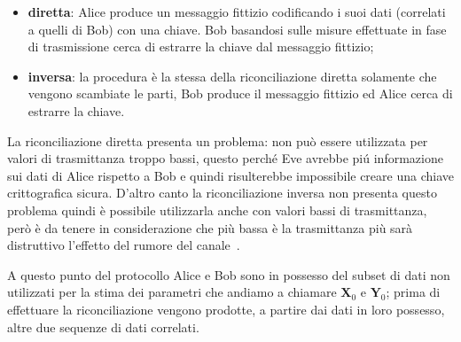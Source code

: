 \begin{itemize}
\item \textbf{diretta}: Alice produce un messaggio fittizio codificando i suoi dati (correlati a quelli di Bob) con una chiave. Bob basandosi sulle misure effettuate in fase di trasmissione cerca di estrarre la chiave dal messaggio fittizio;
\item \textbf{inversa}: la procedura \`e la stessa della riconciliazione diretta solamente che vengono scambiate le parti, Bob produce il messaggio fittizio ed Alice cerca di estrarre la chiave.
\end{itemize} 
 
La riconciliazione diretta presenta un problema: non pu\`o essere utilizzata per valori di trasmittanza troppo bassi, questo perch\'e Eve avrebbe pi\'u informazione sui dati di Alice rispetto a Bob e quindi risulterebbe impossibile creare una chiave crittografica sicura. D'altro canto la riconciliazione inversa non presenta questo problema quindi \`e possibile utilizzarla anche con valori bassi di trasmittanza, per\`o \`e da tenere in considerazione che pi\`u bassa \`e la trasmittanza pi\`u sar\`a distruttivo l'effetto del rumore del canale~\cite{https://doi.org/10.1002/qute.201800011}.


A questo punto del protocollo Alice e Bob sono in possesso del subset di dati non utilizzati per la stima dei parametri che andiamo a chiamare $\textbf{X}_0$ e $\textbf{Y}_0$; prima di effettuare la riconciliazione vengono prodotte, a partire dai dati in loro possesso, altre due sequenze di dati correlati. 

